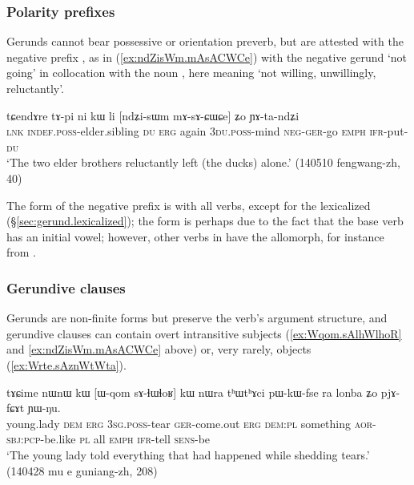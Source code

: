 \subsubsection{Polarity prefixes} \label{sec:gerund.neg}
Gerunds cannot bear possessive or orientation preverb, but are attested with the negative prefix , as in (\ref{ex:ndZisWm.mAsACWCe}) with the negative gerund  `not going' in collocation with the noun , here meaning `not willing, unwillingly, reluctantly'.

\begin{exe}
\ex \label{ex:ndZisWm.mAsACWCe}
\gll tɕendɤre tɤ-pi ni kɯ li [ndʑi-sɯm mɤ-sɤ-ɕɯ\redp{}ɕe] ʑo ɲɤ-ta-ndʑi \\
\textsc{lnk} \textsc{indef}.\textsc{poss}-elder.sibling \textsc{du} \textsc{erg} again \textsc{3du}.\textsc{poss}-mind \textsc{neg}-\textsc{ger}-go \textsc{emph} \textsc{ifr}-put-\textsc{du} \\
\glt `The two elder brothers reluctantly left (the ducks) alone.' (140510 fengwang-zh, 40)
\end{exe}

The form of the negative prefix is  with all verbs, except for the lexicalized  (§\ref{sec:gerund.lexicalized}); the form  is perhaps due to the fact that the base verb  has an initial  vowel; however, other verbs in  have the  allomorph, for instance  from .

 
\subsubsection{Gerundive clauses}  \label{sec:gerund.clauses}
Gerunds are non-finite forms but preserve the verb's argument structure, and gerundive clauses can contain overt intransitive subjects (\ref{ex:Wqom.sAlhWlhoR} and \ref{ex:ndZisWm.mAsACWCe} above) or, very rarely, objects (\ref{ex:Wrte.sAznWtWta}).

\begin{exe}
\ex \label{ex:Wqom.sAlhWlhoR}
\gll tɤɕime nɯnɯ kɯ [ɯ-qom sɤ-ɬɯ\redp{}ɬoʁ] kɯ nɯra tʰɯtʰɤci pɯ-kɯ-fse ra lonba ʑo pjɤ-fɕɤt ɲɯ-ŋu. \\
young.lady \textsc{dem} \textsc{erg} \textsc{3sg}.\textsc{poss}-tear \textsc{ger}-come.out \textsc{erg} \textsc{dem}:\textsc{pl} something \textsc{aor}-\textsc{sbj}:\textsc{pcp}-be.like \textsc{pl} all \textsc{emph} \textsc{ifr}-tell \textsc{sens}-be \\
\glt `The young lady told everything that had happened while shedding tears.' (140428 mu e guniang-zh, 208)
\end{exe}

